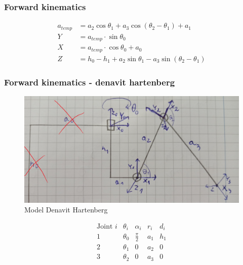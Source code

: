 \documentclass[a4paper,13pt]{article}
\begin{document}
\subsubsection{Forward kinematics}

\begin{equation} \label{FK_ver_1}
\begin{split}
a_{temp} &= a_2 \cos{\theta_1} + a_3 \cos{\left(\theta_2 - \theta_1\right)} + a_1\\
Y &= a_{temp} \cdot \sin{\theta_0}\\
X &= a_{temp} \cdot \cos{\theta_0} + a_0\\
Z &= h_0 - h_1 + a_2 \sin{\theta_1} - a_3 \sin{\left(\theta_2 - \theta_1\right)}
\end{split}
\end{equation}

\subsubsection{Forward kinematics - denavit hartenberg \cite{DH_AA_article}}

\begin{figure}[H]
\includegraphics[width=\textwidth]{img/DH_model.jpg}
\caption{Model Denavit Hartenberg}
\label{math_model}
\end{figure}

\begin{equation}
\begin{array}{c|cccc}
\textrm{Joint } i & \theta_i & \alpha_i & r_i & d_i \\
\hline
1  & \theta_0 & \frac{\pi}{2} & a_1 & h_1 \\
2  & \theta_1 & 0 & a_2 & 0 \\
3  & \theta_2 & 0 & a_3 & 0 \\
\end{array}
\end{equation}
\end{document}
